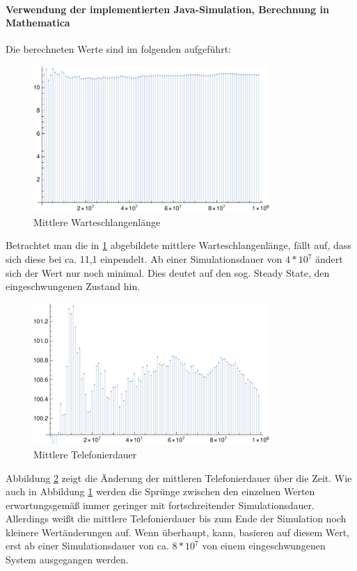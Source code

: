 \paragraph{Verwendung der implementierten Java-Simulation, Berechnung in Mathematica}
Die berechneten Werte sind im folgenden aufgeführt:

\begin{figure}[htpb]
	\centering
	\includegraphics[width=0.8\textwidth]{abbildungen/auswertung100/meanQueueTimePlot.pdf}
	\caption{Mittlere Warteschlangenlänge}
	\label{fig:meanQueueTime100}
\end{figure}
Betrachtet man die in \ref{fig:meanQueueTime100} abgebildete mittlere Warteschlangenlänge, fällt auf, dass sich diese bei ca. 11,1 einpendelt. Ab einer Simulationsdauer von $4*10^7$ ändert sich der Wert nur noch minimal. Dies deutet auf den sog. \glqq Steady State\grqq, den eingeschwungenen Zustand hin.

\begin{figure}[htpb]
	\centering
	\includegraphics[width=0.8\textwidth]{abbildungen/auswertung100/meanCallingTimePlot.pdf}
	\caption{Mittlere Telefonierdauer}
	\label{fig:meanCallingTime100}
\end{figure}

Abbildung \ref{fig:meanCallingTime100} zeigt die Änderung der mittleren Telefonierdauer über die Zeit. Wie auch in Abbildung \ref{fig:meanQueueTime100} werden die Sprünge zwischen den einzelnen Werten erwartungsgemäß immer geringer mit fortschreitender Simulationsdauer. Allerdings weißt die mittlere Telefonierdauer bis zum Ende der Simulation noch kleinere Wertänderungen auf. Wenn überhaupt, kann, basieren auf diesem Wert, erst ab einer Simulationsdauer von ca. $8*10^7$ von einem eingeschwungenen System ausgegangen werden.

